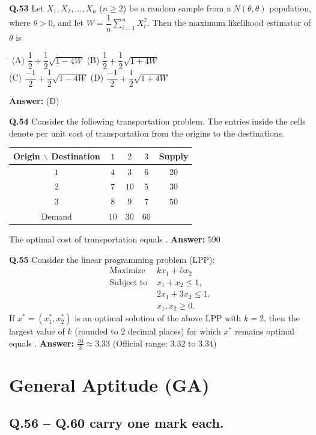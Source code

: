 \documentclass[11pt,a4paper]{article}
\newcommand{\optsfourA}[4]{%
  \begin{tabbing}
    \hspace{0.48\linewidth}\=\kill
    (A) #1 \> (B) #2 \\[2pt]
    (C) #3 \> (D) #4
  \end{tabbing}%
}
\newcommand{\ans}[1]{\textbf{Answer:} #1\par\medskip}
\begin{document}
\textbf{Q.53} Let $X_1, X_2, \dots, X_n$ ($n \ge 2$) be a random sample from a $N(\theta, \theta)$ population, where $\theta > 0$, and let $W = \dfrac{1}{n} \displaystyle\sum_{i=1}^{n} X_i^2$. Then the maximum likelihood estimator of $\theta$ is
\optsfourA{$\dfrac{1}{2} + \dfrac{1}{2}\sqrt{1 - 4W}$}{$\dfrac{1}{2} + \dfrac{1}{2}\sqrt{1 + 4W}$}{$\dfrac{-1}{2} + \dfrac{1}{2}\sqrt{1 - 4W}$}{$\dfrac{-1}{2} + \dfrac{1}{2}\sqrt{1 + 4W}$}
\ans{(D)}

\textbf{Q.54} Consider the following transportation problem. The entries inside the cells denote per unit cost of transportation from the origins to the destinations.
\begin{center}
\begin{tabular}{c|ccc|c}
\toprule
Origin $\backslash$ Destination & $1$ & $2$ & $3$ & Supply \\
\midrule
$1$ & $4$ & $3$ & $6$ & $20$ \\
$2$ & $7$ & $10$ & $5$ & $30$ \\
$3$ & $8$ & $9$ & $7$ & $50$ \\
\midrule
Demand & $10$ & $30$ & $60$ & \\
\bottomrule
\end{tabular}
\end{center}
The optimal cost of transportation equals \underline{\hspace{2cm}}.
\ans{$590$}

\textbf{Q.55} Consider the linear programming problem (LPP):
\begin{align*}
  \text{Maximize } & k x_1 + 5 x_2 \\
  \text{Subject to } & x_1 + x_2 \le 1, \\
                     & 2x_1 + 3x_2 \le 1, \\
                     & x_1, x_2 \ge 0.
\end{align*}
If $x^* = (x_1^*, x_2^*)$ is an optimal solution of the above LPP with $k = 2$, then the largest value of $k$ (rounded to $2$ decimal places) for which $x^*$ remains optimal equals \underline{\hspace{2cm}}.
\ans{$\frac{10}{3} \approx 3.33$ (Official range: $3.32$ to $3.34$)}

\section*{General Aptitude (GA)}

\subsection*{Q.56 -- Q.60 carry one mark each.}
\end{document}
